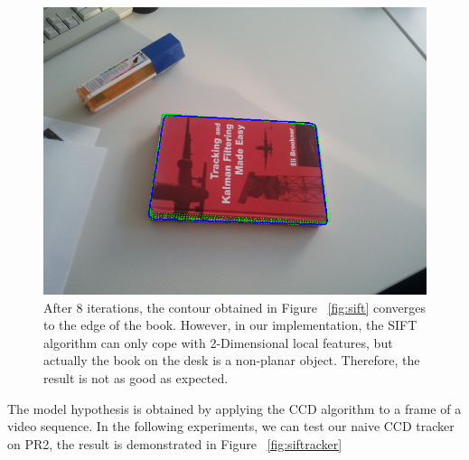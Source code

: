 \begin{figure}[htbp]
  \centering
\includegraphics[width=\linewidth]{images/sift_result.png}
\caption[The contour obtained using the CCD algorithm converges to the
edge of the book]{After 8 iterations, the contour obtained in Figure
  ~\ref{fig:sift} converges to the edge of the book. However, in our
  implementation, the SIFT algorithm can only cope with 2-Dimensional
  local features, but actually the book on the desk is a non-planar
  object. Therefore, the result is not as good as expected.}
\label{fig:sift_result}
\end{figure}

The model hypothesis is obtained by applying the CCD algorithm to a
frame of a video sequence. In the following experiments, we can test
our naive CCD tracker on PR2, the result is demonstrated in Figure
~\ref{fig:siftracker} 

